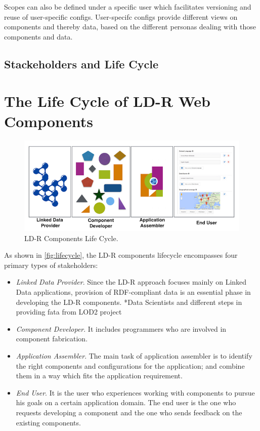 \documentclass{acm_proc_article-sp}
\begin{document}
Scopes can also be defined under a specific user which facilitates versioning and reuse of user-specific configs.
User-specifc configs provide different views on components and thereby data, based on the different personas dealing with those components and data.

\subsection{Stackeholders and Life Cycle}

\section{The Life Cycle of LD-R Web Components}





\begin{figure}[tb]
  \includegraphics[width=1\linewidth]{images/lifecycle.jpg}
  \caption{LD-R Components Life Cycle.}
  \label{fig:lifecycle}
\end{figure}

As shown in \autoref{fig:lifecycle}, the LD-R components lifecycle encompasses four primary types of stakeholders:

\begin{itemize}

\item \emph{Linked Data Provider}.
Since the LD-R approach focuses mainly on Linked Data applications, provision of RDF-compliant data is an essential phase in developing the LD-R components.
*Data Scientists and different steps in providing fata from LOD2 project

\item \emph{Component Developer}. 
It includes programmers who are involved in component fabrication.


\item \emph{Application Assembler}.
The main task of application assembler is to identify the right components and configurations for the application; and combine them in a way which fits the application requirement. 

\item \emph{End User}. 
It is the user who experiences working with components to pursue his goals on a certain application domain.
The end user is the one who requests developing a component and the one who sends feedback on the existing components.

\end{itemize}
\end{document}

